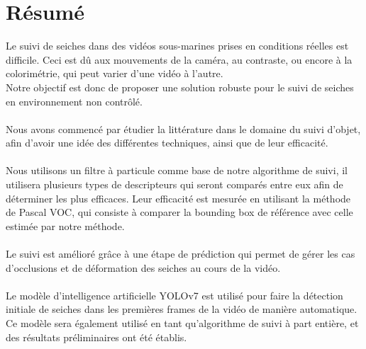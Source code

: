 \pagestyle{plain}
\chapter*{Résumé}
Le suivi de seiches dans des vidéos sous-marines prises en conditions réelles est difficile. Ceci est dû aux mouvements de la caméra, au contraste, ou encore à la colorimétrie, qui peut varier d'une vidéo à l'autre.\\
Notre objectif est donc de proposer une solution robuste pour le suivi de seiches en environnement non contrôlé.\\
\\
Nous avons commencé par étudier la littérature dans le domaine du suivi d'objet, afin d'avoir une idée des différentes techniques, ainsi que de leur efficacité.\\
\\
Nous utilisons un filtre à particule comme base de notre algorithme de suivi, il utilisera plusieurs types de descripteurs qui seront comparés entre eux afin de déterminer les plus efficaces. Leur efficacité est mesurée en utilisant la méthode de Pascal VOC, qui consiste à comparer la bounding box de référence avec celle estimée par notre méthode.\\
\\
Le suivi est amélioré grâce à une étape de prédiction qui permet de gérer les cas d'occlusions et de déformation des seiches au cours de la vidéo.\\
\\
Le modèle d'intelligence artificielle YOLOv7 est utilisé pour faire la détection initiale de seiches dans les premières frames de la vidéo de manière automatique.\\
Ce modèle sera également utilisé en tant qu'algorithme de suivi à part entière, et des résultats préliminaires ont été établis.\\


\clearpage
